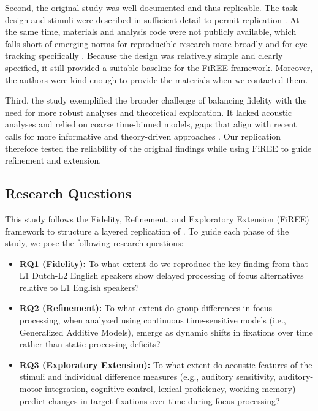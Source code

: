 Second, the original study was well documented and thus replicable. The task design and stimuli were described in sufficient detail to permit replication \parencite{mcmanus2024}. At the same time, materials and analysis code were not publicly available, which falls short of emerging norms for reproducible research more broadly \parencite{goodman2016reproducibility} and for eye-tracking specifically \parencite{godfroid2025reporting,AOW}. Because the design was relatively simple and clearly specified, it still provided a suitable baseline for the 
FiREE framework. Moreover, the authors were kind enough to provide the materials when we contacted them. 

Third, the study exemplified the broader challenge of balancing fidelity with the need for more robust analyses and theoretical exploration. It lacked 
acoustic analyses and relied on coarse time-binned models, gaps that align with recent calls for more informative and theory-driven approaches \parencite{xie2023adaptive}. Our replication therefore tested the reliability of the 
original findings while using FiREE to guide refinement and extension.

\subsection{Research Questions}

This study follows the Fidelity, Refinement, and Exploratory Extension (FiREE) framework to structure a layered replication of \textcite{ge2021a}. To guide each phase of the study, we pose the following research questions:

\begin{itemize}
    \item \textbf{RQ1 (Fidelity):} To what extent do we reproduce the key finding from \textcite{ge2021a} that L1 Dutch-L2 English speakers show delayed processing of focus alternatives relative to L1 English speakers?
    
    \item \textbf{RQ2 (Refinement):} To what extent do group differences in focus processing, when analyzed using continuous time-sensitive models (i.e., Generalized Additive Models), emerge as dynamic shifts in fixations over time rather than static processing deficits?
    
    \item \textbf{RQ3 (Exploratory Extension):} To what extent do acoustic features of the stimuli and individual difference measures (e.g., auditory sensitivity, auditory-motor integration, cognitive control, lexical proficiency, working memory) predict changes in target fixations over time during focus processing?
\end{itemize}
